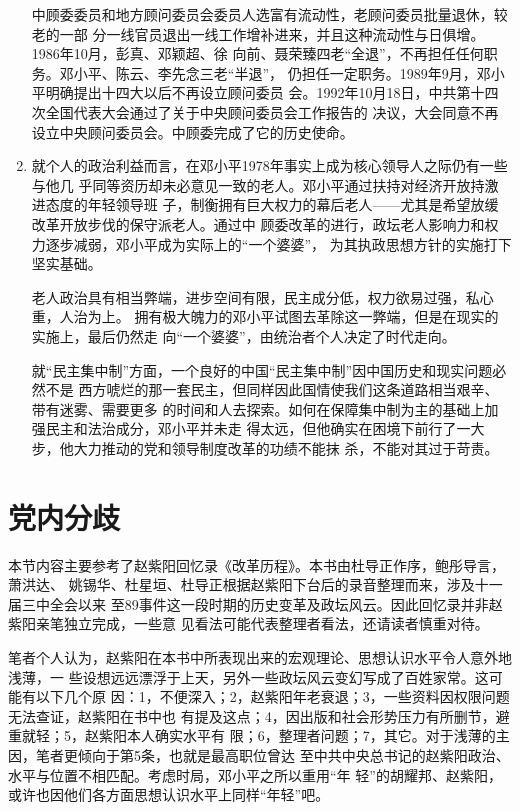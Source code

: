 \begin{enumerate}
  中顾委委员和地方顾问委员会委员人选富有流动性，老顾问委员批量退休，较老的一部
  分一线官员退出一线工作增补进来，并且这种流动性与日俱增。1986年10月，彭真、邓颖超、徐
  向前、聂荣臻四老“全退”，不再担任任何职务。邓小平、陈云、李先念三老“半退”，
  仍担任一定职务。1989年9月，邓小平明确提出十四大以后不再设立顾问委员
  会。1992年10月18日，中共第十四次全国代表大会通过了关于中央顾问委员会工作报告的
  决议，大会同意不再设立中央顾问委员会。中顾委完成了它的历史使命。

\item 就个人的政治利益而言，在邓小平1978年事实上成为核心领导人之际仍有一些与他几
  乎同等资历却未必意见一致的老人。邓小平通过扶持对经济开放持激进态度的年轻领导班
  子，制衡拥有巨大权力的幕后老人——尤其是希望放缓改革开放步伐的保守派老人。通过中
  顾委改革的进行，政坛老人影响力和权力逐步减弱，邓小平成为实际上的“一个婆婆”，
  为其执政思想方针的实施打下坚实基础。

  老人政治具有相当弊端，进步空间有限，民主成分低，权力欲易过强，私心重，人治为上。
  拥有极大魄力的邓小平试图去革除这一弊端，但是在现实的实施上，最后仍然走
  向“一个婆婆”，由统治者个人决定了时代走向。

  就“民主集中制”方面，一个良好的中国“民主集中制”因中国历史和现实问题必然不是
  西方唬烂的那一套民主，但同样因此国情使我们这条道路相当艰辛、带有迷雾、需要更多
  的时间和人去探索。如何在保障集中制为主的基础上加强民主和法治成分，邓小平并未走
  得太远，但他确实在困境下前行了一大步，他大力推动的党和领导制度改革的功绩不能抹
  杀，不能对其过于苛责。
\end{enumerate}

\section{党内分歧}

本节内容主要参考了赵紫阳回忆录《改革历程》。本书由杜导正作序，鲍彤导言，萧洪达、
姚锡华、杜星垣、杜导正根据赵紫阳下台后的录音整理而来，涉及十一届三中全会以来
至89事件这一段时期的历史变革及政坛风云。因此回忆录并非赵紫阳亲笔独立完成，一些意
见看法可能代表整理者看法，还请读者慎重对待。

笔者个人认为，赵紫阳在本书中所表现出来的宏观理论、思想认识水平令人意外地浅薄，一
些设想远远漂浮于上天，另外一些政坛风云变幻写成了百姓家常。这可能有以下几个原
因：1，不便深入；2，赵紫阳年老衰退；3，一些资料因权限问题无法查证，赵紫阳在书中也
有提及这点；4，因出版和社会形势压力有所删节，避重就轻；5，赵紫阳本人确实水平有
限；6，整理者问题；7，其它。对于浅薄的主因，笔者更倾向于第5条，也就是最高职位曾达
至中共中央总书记的赵紫阳政治、水平与位置不相匹配。考虑时局，邓小平之所以重用“年
轻”的胡耀邦、赵紫阳，或许也因他们各方面思想认识水平上同样“年轻”吧。

